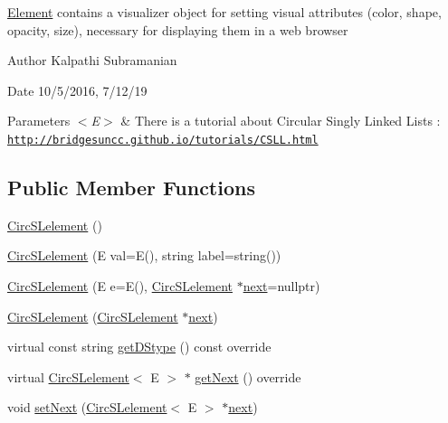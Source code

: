 \hyperlink{classbridges_1_1datastructure_1_1_element}{Element} contains a visualizer object for setting visual attributes (color, shape, opacity, size), necessary for displaying them in a web browser

\begin{DoxyAuthor}{Author}
Kalpathi Subramanian 
\end{DoxyAuthor}
\begin{DoxyDate}{Date}
10/5/2016, 7/12/19
\end{DoxyDate}

\begin{DoxyParams}{Parameters}
{\em $<$\+E$>$} & There is a tutorial about Circular Singly Linked Lists \+: \href{http://bridgesuncc.github.io/tutorials/CSLL.html}{\tt http\+://bridgesuncc.\+github.\+io/tutorials/\+C\+S\+L\+L.\+html} \\
\hline
\end{DoxyParams}
\subsection*{Public Member Functions}
\begin{DoxyCompactItemize}
\item 
\hyperlink{classbridges_1_1datastructure_1_1_circ_s_lelement_a3c79c117602d95cb150517b38442652e}{Circ\+S\+Lelement} ()
\item 
\hyperlink{classbridges_1_1datastructure_1_1_circ_s_lelement_a77f564922261b58522ddb244a8cea0dc}{Circ\+S\+Lelement} (E val=E(), string label=string())
\item 
\hyperlink{classbridges_1_1datastructure_1_1_circ_s_lelement_aaedaa1d980bd5a66511b57cd20a8d94c}{Circ\+S\+Lelement} (E e=E(), \hyperlink{classbridges_1_1datastructure_1_1_circ_s_lelement}{Circ\+S\+Lelement} $\ast$\hyperlink{classbridges_1_1datastructure_1_1_s_lelement_afc016a593a4a5aba82021ee34edadbfc}{next}=nullptr)
\item 
\hyperlink{classbridges_1_1datastructure_1_1_circ_s_lelement_a89f06ba76b1fdf1d2343c5f18f226722}{Circ\+S\+Lelement} (\hyperlink{classbridges_1_1datastructure_1_1_circ_s_lelement}{Circ\+S\+Lelement} $\ast$\hyperlink{classbridges_1_1datastructure_1_1_s_lelement_afc016a593a4a5aba82021ee34edadbfc}{next})
\item 
virtual const string \hyperlink{classbridges_1_1datastructure_1_1_circ_s_lelement_a775ba08a7811fe91c396cb27ba9343ab}{get\+D\+Stype} () const override
\item 
virtual \hyperlink{classbridges_1_1datastructure_1_1_circ_s_lelement}{Circ\+S\+Lelement}$<$ E $>$ $\ast$ \hyperlink{classbridges_1_1datastructure_1_1_circ_s_lelement_aff77056ace1361a35a09dc006eba34a3}{get\+Next} () override
\item 
void \hyperlink{classbridges_1_1datastructure_1_1_circ_s_lelement_a623d302217fce43a444e6da5e1de9b40}{set\+Next} (\hyperlink{classbridges_1_1datastructure_1_1_circ_s_lelement}{Circ\+S\+Lelement}$<$ E $>$ $\ast$\hyperlink{classbridges_1_1datastructure_1_1_s_lelement_afc016a593a4a5aba82021ee34edadbfc}{next})
\end{DoxyCompactItemize}
